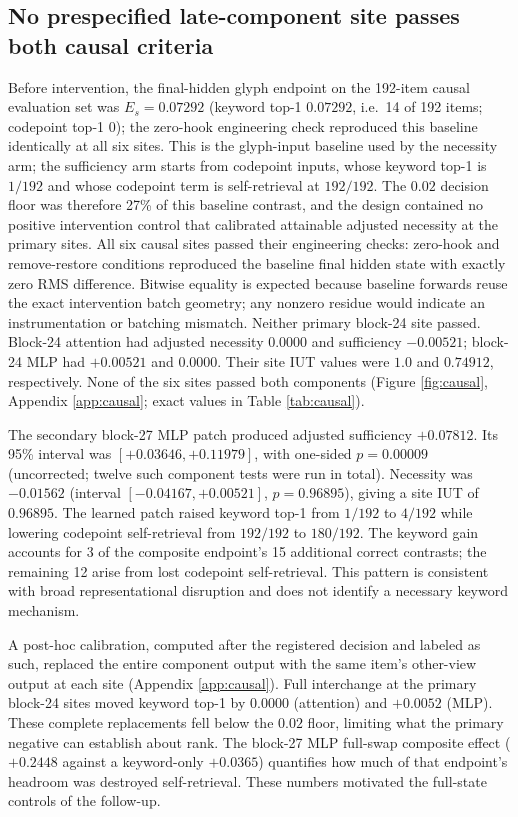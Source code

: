 \documentclass{article}
\begin{document}
\subsection{No prespecified late-component site passes both causal criteria}

Before intervention, the final-hidden glyph endpoint on the 192-item causal
evaluation set was $E_s=0.07292$ (keyword top-1 $0.07292$, i.e.\ 14 of 192
items; codepoint top-1 $0$); the zero-hook engineering check reproduced this
baseline identically at all six sites. This is the glyph-input baseline used
by the necessity arm; the sufficiency arm starts from codepoint inputs, whose
keyword top-1 is $1/192$ and whose codepoint term is self-retrieval at
$192/192$. The
$0.02$ decision floor was therefore 27\% of this baseline contrast, and the
design contained no positive intervention control that calibrated attainable
adjusted necessity at the primary sites. All six causal sites passed
their engineering checks: zero-hook and
remove-restore conditions reproduced the baseline final hidden state with
exactly zero RMS difference. Bitwise equality is expected because baseline
forwards reuse the exact intervention batch geometry; any nonzero residue
would indicate an instrumentation or batching mismatch. Neither primary block-24 site
passed. Block-24 attention had adjusted necessity $0.0000$ and sufficiency
$-0.00521$; block-24 MLP had $+0.00521$ and $0.0000$. Their site IUT values
were $1.0$ and $0.74912$, respectively. None of the six sites passed both
components (Figure \ref{fig:causal}, Appendix \ref{app:causal}; exact values
in Table \ref{tab:causal}).

The secondary block-27 MLP patch produced adjusted sufficiency $+0.07812$.
Its 95\% interval was $[+0.03646,+0.11979]$, with one-sided $p=0.00009$
(uncorrected; twelve such component tests were run in total). Necessity was $-0.01562$ (interval
$[-0.04167,+0.00521]$, $p=0.96895$), giving a site IUT of $0.96895$.
The learned patch raised keyword top-1 from $1/192$ to $4/192$ while lowering
codepoint self-retrieval from $192/192$ to $180/192$. The keyword gain accounts
for 3 of the composite endpoint's 15 additional correct contrasts; the
remaining 12 arise from lost codepoint self-retrieval. This pattern is
consistent with broad representational disruption and does not identify a
necessary keyword mechanism.

A post-hoc calibration, computed after the registered decision and labeled as
such, replaced the entire component output with the same item's other-view
output at each site (Appendix \ref{app:causal}). Full interchange at the
primary block-24 sites moved keyword top-1 by $0.0000$ (attention) and
$+0.0052$ (MLP). These complete replacements fell below the $0.02$ floor,
limiting what the primary negative can establish about rank. The block-27
MLP full-swap composite effect ($+0.2448$ against a
keyword-only $+0.0365$) quantifies how much of that endpoint's headroom was
destroyed self-retrieval. These numbers motivated the full-state controls of
the follow-up.
\end{document}
